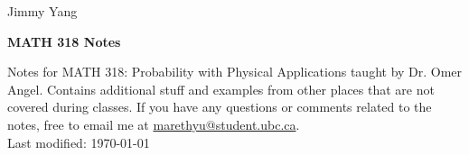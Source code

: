 \documentclass[12pt, a4paper]{article}
\newcommand{\doctitle}{MATH 318 Notes}
\newcommand{\name}{Jimmy Yang}
\newcounter{exa}
\begin{document}
\begin{flushright}
\name
\end{flushright}

\begin{center}
\Large
\bfseries
\doctitle
\end{center}

\thispagestyle{plain}

\begin{center}
Notes for MATH 318: Probability with Physical Applications taught by Dr. Omer Angel. Contains additional stuff and examples from other places that are not covered during classes. If you have any questions or comments related to the notes, free to email me at \href{mailto:marethyu@student.ubc.ca}{marethyu@student.ubc.ca}. \\
Last modified: \today
\end{center}

\tableofcontents
\newpage

\newpage

\newpage

\newpage

\newpage

\newpage

\end{document}
